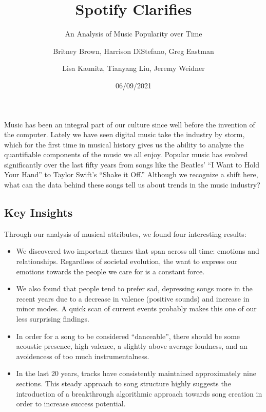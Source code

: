 \documentclass[
  12pt,
]{article}
\title{Spotify Clarifies}
\subtitle{An Analysis of Music Popularity over Time}
\author{Britney Brown, Harrison DiStefano, Greg Eastman \and Lisa
Kaunitz, Tianyang Liu, Jeremy Weidner}
\date{06/09/2021}
\begin{document}
\maketitle

\vspace{8pt}

Music has been an integral part of our culture since well before the
invention of the computer. Lately we have seen digital music take the
industry by storm, which for the first time in musical history gives us
the ability to analyze the quantifiable components of the music we all
enjoy. Popular music has evolved significantly over the last fifty years
from songs like the Beatles' ``I Want to Hold Your Hand'' to Taylor
Swift's ``Shake it Off.'' Although we recognize a shift here, what can
the data behind these songs tell us about trends in the music industry?

\vspace{12pt}

\hypertarget{key-insights}{%
\subsection{Key Insights}\label{key-insights}}

Through our analysis of musical attributes, we found four interesting
results:

\begin{itemize}
\item
  We discovered two important themes that span across all time: emotions
  and relationships. Regardless of societal evolution, the want to
  express our emotions towards the people we care for is a constant
  force.
\item
  We also found that people tend to prefer sad, depressing songs more in
  the recent years due to a decrease in valence (positive sounds) and
  increase in minor modes. A quick scan of current events probably makes
  this one of our less surprising findings.
\item
  In order for a song to be considered ``danceable'', there should be
  some acoustic presence, high valence, a slightly above average
  loudness, and an avoidencess of too much instrumentalness.
\item
  In the last 20 years, tracks have consistently maintained
  approximately nine sections. This steady approach to song structure
  highly suggests the introduction of a breakthrough algorithmic
  approach towards song creation in order to increase success potential.
\end{itemize}
\end{document}
